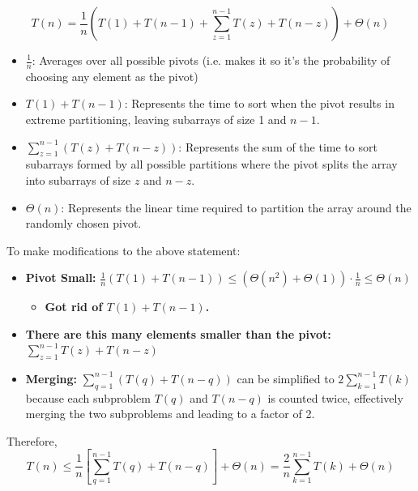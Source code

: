     \begin{derivation}
        \[
        T(n) = \frac{1}{n} \left( T(1) + T(n-1) + \sum_{z=1}^{n-1} T(z) + T(n-z) \right) + \Theta(n)
        \]
        \begin{itemize}
            \item $\frac{1}{n}$: Averages over all possible pivots (i.e. makes it so it's the probability of choosing any element as the pivot)
            \item $T(1) + T(n - 1)$: Represents the time to sort when the pivot results in extreme partitioning, leaving subarrays of size 1 and $n-1$.
            \item $\sum_{z=1}^{n-1} \left(T(z) + T(n - z)\right)$: Represents the sum of the time to sort subarrays formed by all possible partitions where the pivot splits the array into subarrays of size $z$ and $n-z$.
            \item $\Theta(n)$: Represents the linear time required to partition the array around the randomly chosen pivot.
        \end{itemize}
        \vspace{1em}

        To make modifications to the above statement:

        \begin{itemize}
            \item \textbf{Pivot Small:} $\frac{1}{n} (T(1) + T(n-1)) \leq (\Theta(n^2) + \Theta(1)) \cdot \frac{1}{n} \leq \Theta(n)$
            \begin{itemize}
                \item \textbf{Got rid of \( T(1) + T(n-1) \).}
            \end{itemize}
            
            \item \textbf{There are this many elements smaller than the pivot:} $\sum_{z=1}^{n-1} T(z) + T(n-z)$
            
            \item \textbf{Merging:} $\sum_{q=1}^{n-1} \left( T(q) + T(n - q) \right)$ can be simplified to $2 \sum_{k=1}^{n-1} T(k)$ because each subproblem $T(q)$ and $T(n - q)$ is counted twice, effectively merging the two subproblems and leading to a factor of 2.
        \end{itemize}
        \vspace{1em}

        Therefore,
        \[
        T(n) \leq \frac{1}{n} \left[ \sum_{q=1}^{n-1} T(q) + T(n-q) \right] + \Theta(n) = \frac{2}{n} \sum_{k=1}^{n-1} T(k) + \Theta(n)
        \]
        \vspace{1em}


\end{derivation}

